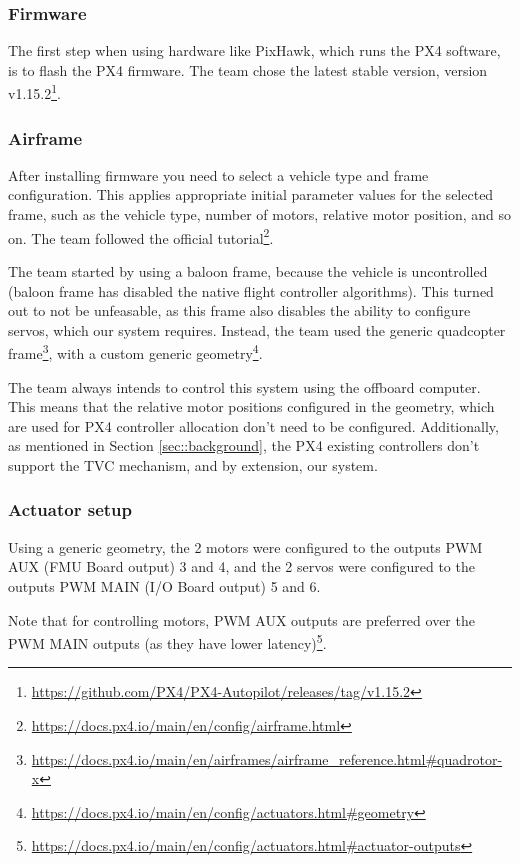 \documentclass[a4paper]{article}
\begin{document}
\subsubsection{Firmware}

The first step when using hardware like PixHawk, which runs the PX4 software, is to flash the PX4 firmware. 
The team chose the latest stable version, version v1.15.2\footnote{\url{https://github.com/PX4/PX4-Autopilot/releases/tag/v1.15.2}}. 

\subsubsection{Airframe}

After installing firmware you need to select a vehicle type and frame configuration. 
This applies appropriate initial parameter values for the selected frame, such as the vehicle type, number of motors, relative motor position, and so on. 
The team followed the official tutorial\footnote{\url{https://docs.px4.io/main/en/config/airframe.html}}. 

The team started by using a baloon frame, because the vehicle is uncontrolled (baloon frame has disabled the native flight controller algorithms). 
This turned out to not be unfeasable, as this frame also disables the ability to configure servos, which our system requires. 
Instead, the team used the generic quadcopter frame\footnote{\url{https://docs.px4.io/main/en/airframes/airframe_reference.html\#quadrotor-x}}, with a custom generic geometry\footnote{\url{https://docs.px4.io/main/en/config/actuators.html\#geometry}}. 

The team always intends to control this system using the offboard computer. This means that the relative motor positions configured in the geometry, which are used for PX4 controller allocation don't need to be configured. Additionally, as mentioned in Section \ref{sec::background}, the PX4 existing controllers don't support the TVC mechanism, and by extension, our system. 

\subsubsection{Actuator setup}
Using a generic geometry, the 2 motors were configured to the outputs PWM AUX (FMU Board output) 3 and 4, and the 2 servos were configured to the outputs PWM MAIN (I/O Board output) 5 and 6. 

Note that for controlling motors, PWM AUX outputs are preferred over the PWM MAIN outputs (as they have lower latency)\footnote{\url{https://docs.px4.io/main/en/config/actuators.html\#actuator-outputs}}. 
\end{document}
